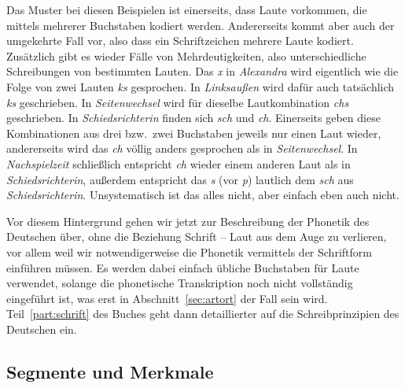 \begin{exe}
  \ex
  \begin{xlist}
  \end{xlist}
\end{exe}

Das Muster bei diesen Beispielen ist einerseits, dass Laute vorkommen, die mittels mehrerer Buchstaben kodiert werden.
Andererseits kommt aber auch der umgekehrte Fall vor, also dass ein Schriftzeichen mehrere Laute kodiert.
Zusätzlich gibt es wieder Fälle von Mehrdeutigkeiten, also unterschiedliche Schreibungen von bestimmten Lauten.
Das \textit{x} in \textit{Alexandra} wird eigentlich wie die Folge von zwei Lauten \textit{ks} gesprochen.
In \textit{Linksaußen} wird dafür auch tatsächlich \textit{ks} geschrieben.
In \textit{Seitenwechsel} wird für dieselbe Lautkombination \textit{chs} geschrieben.
In \textit{Schiedsrichterin} finden sich \textit{sch} und \textit{ch}.
Einerseits geben diese Kombinationen aus drei bzw.\ zwei Buchstaben jeweils nur einen Laut wieder, andererseits wird das \textit{ch} völlig anders gesprochen als in \textit{Seitenwechsel}.
In \textit{Nachspielzeit} schließlich entspricht \textit{ch} wieder einem anderen Laut als in \textit{Schiedsrichterin}, außerdem entspricht das \textit{s} (vor \textit{p}) lautlich dem \textit{sch} aus \textit{Schiedsrichterin}.
Unsystematisch ist das alles nicht, aber einfach eben auch nicht.

Vor diesem Hintergrund gehen wir jetzt zur Beschreibung der Phonetik des Deutschen über, ohne die Beziehung Schrift -- Laut aus dem Auge zu verlieren, vor allem weil wir notwendigerweise die Phonetik vermittels der Schriftform einführen müssen.
Es werden dabei einfach übliche Buchstaben für Laute verwendet, solange die phonetische Transkription noch nicht vollständig eingeführt ist, was erst in Abschnitt~\ref{sec:artort} der Fall sein wird.
Teil~\ref{part:schrift} des Buches geht dann detaillierter auf die Schreibprinzipien des Deutschen ein.

\subsection{Segmente und Merkmale}

